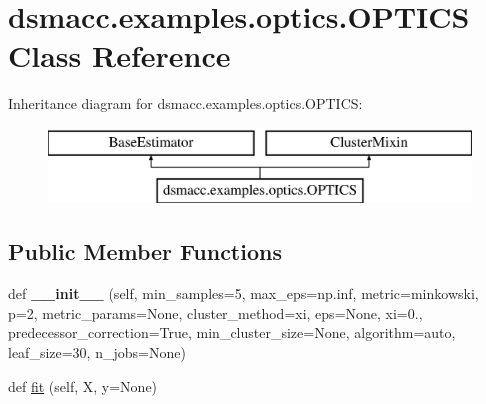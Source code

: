 \hypertarget{classdsmacc_1_1examples_1_1optics_1_1OPTICS}{}\section{dsmacc.\+examples.\+optics.\+O\+P\+T\+I\+CS Class Reference}
\label{classdsmacc_1_1examples_1_1optics_1_1OPTICS}
Inheritance diagram for dsmacc.\+examples.\+optics.\+O\+P\+T\+I\+CS\+:\begin{figure}[H]
\begin{center}
\leavevmode
\includegraphics[height=2.000000cm]{classdsmacc_1_1examples_1_1optics_1_1OPTICS}
\end{center}
\end{figure}
\subsection*{Public Member Functions}
\begin{DoxyCompactItemize}
\item 
\mbox{\label{classdsmacc_1_1examples_1_1optics_1_1OPTICS_a476c32bea8626cc8f5f5133177fce38d}} 
def {\bfseries \+\_\+\+\_\+init\+\_\+\+\_\+} (self, min\+\_\+samples=5, max\+\_\+eps=np.\+inf, metric=\textquotesingle{}minkowski\textquotesingle{}, p=2, metric\+\_\+params=None, cluster\+\_\+method=\textquotesingle{}xi\textquotesingle{}, eps=None, xi=0., predecessor\+\_\+correction=True, min\+\_\+cluster\+\_\+size=None, algorithm=\textquotesingle{}auto\textquotesingle{}, leaf\+\_\+size=30, n\+\_\+jobs=None)
\item 
def \mbox{\hyperlink{classdsmacc_1_1examples_1_1optics_1_1OPTICS_ade14f35d1a29e595c853098bc4e49b29}{fit}} (self, X, y=None)
\end{DoxyCompactItemize}
